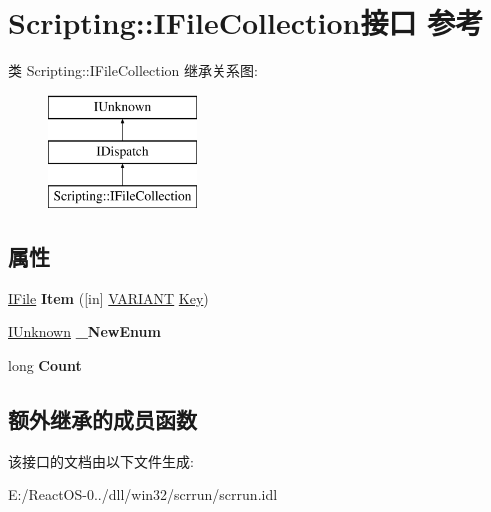 \hypertarget{interface_scripting_1_1_i_file_collection}{}\section{Scripting\+:\+:I\+File\+Collection接口 参考}
\label{interface_scripting_1_1_i_file_collection}
类 Scripting\+:\+:I\+File\+Collection 继承关系图\+:\begin{figure}[H]
\begin{center}
\leavevmode
\includegraphics[height=3.000000cm]{interface_scripting_1_1_i_file_collection}
\end{center}
\end{figure}
\subsection*{属性}
\begin{DoxyCompactItemize}
\item 
\mbox{\label{interface_scripting_1_1_i_file_collection_a41463915b11aa95be3c36f20fde2d734}} 
\hyperlink{interface_scripting_1_1_i_file}{I\+File} {\bfseries Item} (\mbox{[}in\mbox{]} \hyperlink{structtag_v_a_r_i_a_n_t}{V\+A\+R\+I\+A\+NT} \hyperlink{struct_key}{Key})
\item 
\mbox{\label{interface_scripting_1_1_i_file_collection_acce883710fc56450474b92bb7d050529}} 
\hyperlink{interface_i_unknown}{I\+Unknown} {\bfseries \+\_\+\+New\+Enum}
\item 
\mbox{\label{interface_scripting_1_1_i_file_collection_ae242ad7e8860516b4f5c930ba8a94df9}} 
long {\bfseries Count}
\end{DoxyCompactItemize}
\subsection*{额外继承的成员函数}


该接口的文档由以下文件生成\+:\begin{DoxyCompactItemize}
\item 
E\+:/\+React\+O\+S-\/0../dll/win32/scrrun/scrrun.\+idl\end{DoxyCompactItemize}
